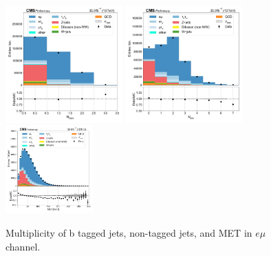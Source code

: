\begin{figure}[htb!]
    \centering
    \includegraphics[width=0.4\textwidth]{chapters/Analysis/sectionPlots/figures/data_mc_overlays/emu_2016_inclusive_linear_jet_n_bjets}
    \includegraphics[width=0.4\textwidth]{chapters/Analysis/sectionPlots/figures/data_mc_overlays/emu_2016_inclusive_linear_jet_n_jets}
    \includegraphics[width=0.3\textwidth]{chapters/Analysis/sectionPlots/figures/data_mc_overlays/emu_2016_inclusive_linear_misc_met_mag}
    \caption{Multiplicity of b tagged jets, non-tagged jets, and MET in
    $e\mu$ channel.}
    \label{fig:analysis:plots:emu_jetmet}
\end{figure}

